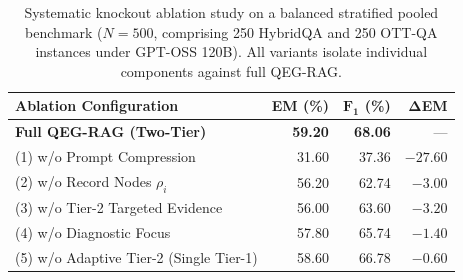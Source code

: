 \documentclass[runningheads]{llncs}
\begin{document}
\begin{table}[t]
\caption{Systematic knockout ablation study on a balanced stratified pooled benchmark ($N=500$, comprising 250 HybridQA and 250 OTT-QA instances under GPT-OSS 120B). All variants isolate individual components against full QEG-RAG.}
\label{tab:ablation}
\vspace{0.5mm}
\centering
\scriptsize
\renewcommand{\arraystretch}{0.78}
\setlength{\tabcolsep}{8pt}
\begin{tabular}{@{}lrrr@{}}
\toprule
\textbf{Ablation Configuration} & \textbf{EM (\%)} & $\mathbf{F_1}$ \textbf{(\%)} & $\mathbf{\Delta}$\textbf{EM} \\
\midrule
\textbf{Full QEG-RAG (Two-Tier)} & \textbf{59.20} & \textbf{68.06} & --- \\
\midrule
(1) w/o Prompt Compression       & 31.60 & 37.36 & $-27.60$ \\
(2) w/o Record Nodes $\rho_i$    & 56.20 & 62.74 & $-3.00$  \\
(3) w/o Tier-2 Targeted Evidence & 56.00 & 63.60 & $-3.20$  \\
(4) w/o Diagnostic Focus         & 57.80 & 65.74 & $-1.40$  \\
(5) w/o Adaptive Tier-2 (Single Tier-1) & 58.60 & 66.78 & $-0.60$  \\
\bottomrule
\end{tabular}
\vspace{0.5mm}
\end{table}
\end{document}
